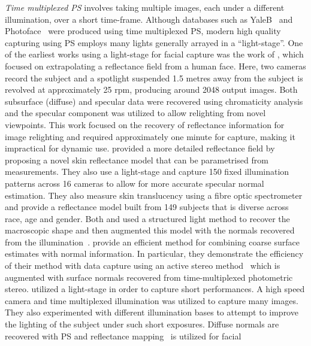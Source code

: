 \textit{Time multiplexed PS} involves taking multiple images, each under
a different illumination, over a short time-frame. Although databases such as
YaleB~\cite{georghiades2001fromfew} and Photoface~\cite{zafeiriou2013photoface} were produced
using time multiplexed PS, modern high quality capturing using PS employs
many lights generally arrayed in a ``light-stage''. One of the earliest works
using a light-stage for facial capture was the work of
\citet{debevec2000acquiring}, which focused on extrapolating a reflectance
field from a human face. Here, two cameras record the subject and a spotlight
suspended 1.5 metres away from the subject is revolved at approximately 25 rpm,
producing around 2048 output images. Both subsurface (diffuse) and specular data
were recovered using chromaticity analysis and the specular component was
utilized to allow relighting from novel viewpoints. This work focused on the
recovery of reflectance information for image relighting and required
approximately one minute for capture, making it impractical for dynamic use.
\citet{weyrich2006analysis} provided a more
detailed reflectance field by proposing a novel skin reflectance model
that can be parametrised from measurements. They also use a light-stage and
capture 150 fixed illumination patterns across 16 cameras to allow for more
accurate specular normal estimation. They also measure skin translucency
using a fibre optic spectrometer~\cite{nickell2000anisotropy} and provide
a reflectance model built from 149 subjects that is diverse across race, age and
gender. Both \citet{weyrich2006analysis} and \citet{debevec2000acquiring} used
a structured light method to recover
the macroscopic shape and then augmented this model with the normals
recovered from the illumination~\cite{nehab2005efficiently}.
\cite{nehab2005efficiently} provide an efficient method for combining coarse
surface estimates with normal information. In particular, they demonstrate the
efficiency of their method with data capture using an
active stereo method~\cite{zhang2003spacetime,davis2005spacetime} which is
augmented with surface normals recovered from time-multiplexed photometric
stereo.
\citet{wenger2005performance} utilized a light-stage in order to capture
short performances. A high speed camera and time multiplexed illumination was
utilized to capture many images. They also experimented with different
illumination bases to attempt to improve the lighting of the subject
under such short exposures. Diffuse normals are recovered with PS and
reflectance mapping~\cite{miller1984illumination} is utilized for facial
